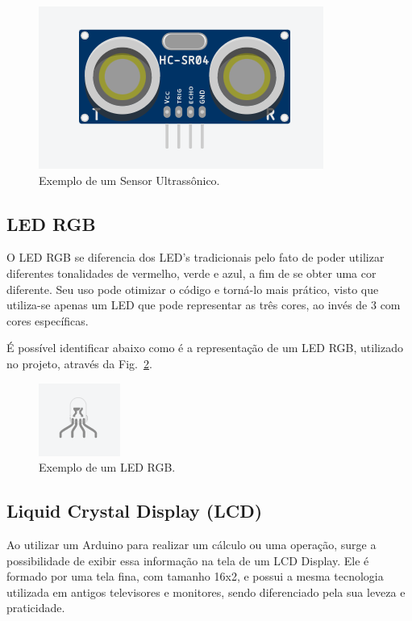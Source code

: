 \documentclass[conference]{IEEEtran}
\begin{document}
\begin{figure}[htbp]
    \centerline{
        \includegraphics{images/Sensor.png}
        }
    \caption{Exemplo de um Sensor Ultrassônico.}
    \label{fig}
    \end{figure}

\subsection{LED RGB}

    O LED RGB se diferencia dos LED's tradicionais pelo fato de poder utilizar diferentes tonalidades de
vermelho, verde e azul, a fim de se obter uma cor diferente. Seu uso pode otimizar o código e torná-lo
mais prático, visto que utiliza-se apenas um LED que pode representar as três cores, ao invés de 3 com
cores específicas.

É possível identificar abaixo como é a representação de um LED RGB, utilizado no projeto, através
da Fig.~\ref{fig}.

\begin{figure}[htbp]
    \centerline{
        \includegraphics{images/LED_RGB.png}
        }
    \caption{Exemplo de um LED RGB.}
    \label{fig}
    \end{figure}

\subsection{Liquid Crystal Display (LCD)}

    Ao utilizar um Arduino para realizar um cálculo ou uma operação, surge a possibilidade de exibir essa
informação na tela de um LCD Display. Ele é formado por uma tela fina, com tamanho 16x2, e possui a mesma
tecnologia utilizada em antigos televisores e monitores, sendo diferenciado pela sua leveza e praticidade.
\end{document}
